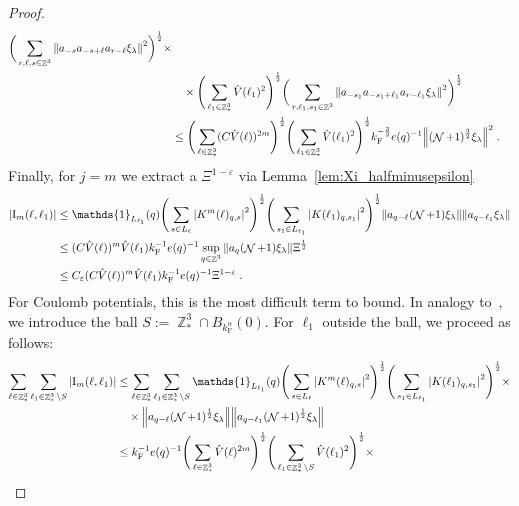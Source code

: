 \documentclass[12pt,a4paper]{article}
\numberwithin{equation}{section}
\newcommand{\1}{\mathbb{I}}
\newcommand{\F}{\mathrm{F}}
\newcommand{\I}{\mathrm{I}}
\DeclareMathOperator{\Z}{\mathbb{Z}}
\DeclareMathOperator{\NN}{\mathcal{N}}
\newcommand{\half}{\frac{1}{2}}
\theoremstyle{plain}
\theoremstyle{definition}
\theoremstyle{remark}
\theoremstyle{plain}
\theoremstyle{definition}
\theoremstyle{remark}
\begin{document}
\begin{proof}
{\begin{align}
	\bigg( \sum\limits_{r, \ell, s\in \Z^3} \norm{ a_{-s} a_{-s+\ell} a_{r-\ell} \xi_\lambda}^2\bigg)^\half \times \nonumber\\
		&\quad \times 
		\Bigg( \sum_{\ell_1 \in \Z^3_*} \hat{V}(\ell_1)^2 \Bigg)^{\half}
	\bigg(
		\sum\limits_{r, \ell_1, s_1 \in \Z^3} \norm{ a_{-s_1} a_{-s_1 + \ell_1} a_{r-\ell_1} \xi_\lambda }^2\bigg)^\half
	\nonumber\\
	&\leq \Bigg( \sum_{\ell \in \Z^3_*} (C \hat{V}(\ell))^{2m} \Bigg)^{\half}
		\Bigg( \sum_{\ell_1 \in \Z^3_*} \hat{V}(\ell_1)^2 \Bigg)^{\half}
		k_{\F}^{-\frac 32} e(q)^{-1}
	\norm{ (\NN+1)^{\frac 32} \xi_\lambda}^2 \;. \label{eq:estEQ2112_Coulomb}
\end{align}
}
Finally, for $ j = m $ we extract a $ \Xi^{1-\varepsilon} $ via Lemma~\ref{lem:Xi_halfminusepsilon}
\begin{align}
	|\I_m(\ell, \ell_1)|
	&\leq \mathds{1}_{L_{\ell_1}}(q) \Bigg(\sum\limits_{s \in L_{\ell}} \abs{K^m(\ell)_{q,s}}^2\Bigg)^\half
		\Bigg(\sum\limits_{s_1 \in L_{\ell_1}} \abs{K(\ell_1)_{q,s_1}}^2\Bigg)^\half
		\norm{ a_{q-\ell} (\NN+1) \xi_\lambda}
		\norm{ a_{q-\ell_1} \xi_\lambda }\nonumber\\
	&\leq (C \hat{V}(\ell))^m \hat{V}(\ell_1) k_{\F}^{-1} e(q)^{-1}
		\sup_{q \in \Z^3} \norm{ a_q (\NN+1) \xi_\lambda }\Xi^{\half} \nonumber\\
	&\leq C_\varepsilon (C \hat{V}(\ell))^m
		\hat{V}(\ell_1)
		k_{\F}^{-1} e(q)^{-1} \Xi^{1-\varepsilon} \;. \label{eq:estEQ2113}
\end{align}
\textcolor{green!30!black}{
For Coulomb potentials, this is the most difficult term to bound. In analogy to~\cite{CHN24}, we introduce the ball $ S := \Z^3_* \cap B_{k_{\F}^{\alpha}}(0) $. For $ \ell_1 $ outside the ball, we proceed as follows:
\begin{align}
	\sum_{\ell \in \Z^3_*} \sum_{\ell_1 \in \Z^3_* \setminus S} |\I_m(\ell, \ell_1)|
	&\leq \sum_{\ell \in \Z^3_*} \sum_{\ell_1 \in \Z^3_* \setminus S} \mathds{1}_{L_{\ell_1}}(q) \Bigg(\sum\limits_{s \in L_{\ell}} \abs{K^m(\ell)_{q,s}}^2\Bigg)^\half
		\Bigg(\sum\limits_{s_1 \in L_{\ell_1}} \abs{K(\ell_1)_{q,s_1}}^2\Bigg)^\half \times \nonumber \\
	& \quad \times \norm{ a_{q-\ell} (\NN+1)^{\half} \xi_\lambda}
		\norm{ a_{q-\ell_1} (\NN+1)^{\half} \xi_\lambda }\nonumber\\
	&\leq k_{\F}^{-1} e(q)^{-1}
		\Bigg( \sum_{\ell \in \Z^3_*} \hat{V}(\ell)^{2m} \Bigg)^{\half}
		\Bigg( \sum_{\ell_1 \in \Z^3_* \setminus S} \hat{V}(\ell_1)^2 \Bigg)^{\half} \times \nonumber \\

\end{align}}
\end{proof}
\end{document}
